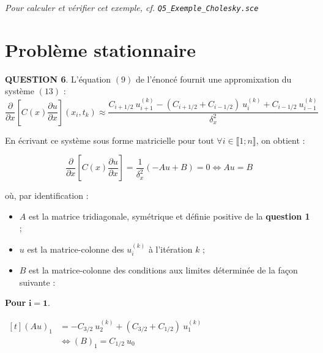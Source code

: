 \documentclass[a4paper,11pt]{article}
\newcommand{\quest}[1]{\small\textbf{#1}\normalsize}
\theoremstyle{nonumberplain}
\theoremstyle{nonumberplain}
\theoremstyle{nonumberplain}
\begin{document}
    \begin{ref_scilab}
        \emph{Pour calculer et vérifier cet exemple, cf.} \texttt{\emph{Q5\_Exemple\_Cholesky.sce}}
    \end{ref_scilab}

\section{Problème stationnaire}

    \quest{QUESTION 6}. L'équation $(9)$ de l'énoncé fournit une appromixation du système $(13)$ :
        $$ \frac{\partial }{\partial x} [C(x)\frac{\partial u }{\partial x}](x_i, t_k) \approx \frac{C_{i+1/2}\ u_{i+1}^{(k)} - (C_{i+1/2} + C_{i-1/2})\ u_i^{(k)} + C_{i-1/2}\ u_{i-1}^{(k)}}{\delta_x^2} $$

    En écrivant ce système sous forme matricielle pour tout $\forall i \in \llbracket 1; n \rrbracket$, on obtient :
    \begin{calculs}
        $$ \frac{\partial }{\partial x} [C(x)\frac{\partial u }{\partial x}] = \frac{1}{\delta_{x}^2} (-A u + B) = 0
        \iff
        A u = B
        $$
    \end{calculs}

    où, par identification :
    \begin{itemize}
        \item $A$ est la matrice tridiagonale, symétrique et définie positive de la \quest{question 1} ;
        \item $u$ est la matrice-colonne des $u_i^{(k)}$ à l'itération $k$ ;
        \item $B$ est la matrice-colonne des conditions aux limites déterminée de la façon suivante :
    \end{itemize}

    \bigskip
    \textbf{Pour }$\mathbf{i = 1}$.
    \begin{calculs}
        $\begin{aligned}[t]
            (Au)_{1} & = -C_{3/2}\ u_{2}^{(k)} + (C_{3/2} + C_{1/2})\ u_1^{(k)} \\
                     &\iff (B)_{1} = C_{1/2}\ u_{0}
        \end{aligned}$
    \end{calculs}
\end{document}
